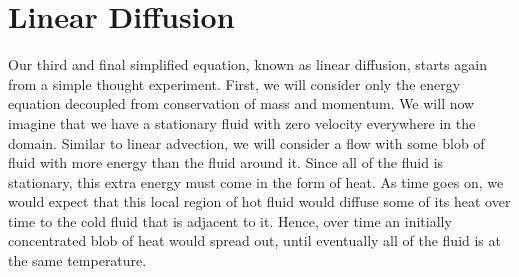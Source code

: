 \section{Linear Diffusion}
Our third and final simplified equation, known as linear diffusion, starts again from a simple thought experiment. First, we will consider only the energy equation decoupled from conservation of mass and momentum. We will now imagine that we have a stationary fluid with zero velocity everywhere in the domain. Similar to linear advection, we will consider a flow with some blob of fluid with more energy than the fluid around it. Since all of the fluid is stationary, this extra energy must come in the form of heat. As time goes on, we would expect that this local region of hot fluid would diffuse some of its heat over time to the cold fluid that is adjacent to it. Hence, over time an initially concentrated blob of heat would spread out, until eventually all of the fluid is at the same temperature.

